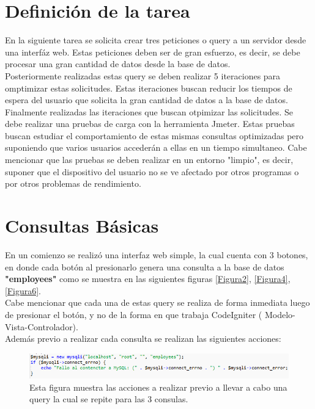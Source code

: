 \section{Definición de la tarea} \label{tarea}

En la siguiente tarea se solicita crear tres peticiones o query a un servidor desde una interfáz web. Estas peticiones deben ser de gran esfuerzo, es decir, se debe procesar una gran cantidad de datos desde la base de datos.\\

Posteriormente realizadas estas query se deben realizar 5 iteraciones para omptimizar estas solicitudes. Estas iteraciones buscan reducir los tiempos de espera del usuario que solicita la gran cantidad de datos a la base de datos.\\

Finalmente realizadas las iteraciones que buscan otpimizar las solicitudes. Se debe realizar una pruebas de carga con la herramienta Jmeter. Estas pruebas buscan estudiar el comportamiento de estas mismas consultas optimizadas pero suponiendo que varios usuarios accederán a ellas en un tiempo simultaneo. Cabe mencionar que las pruebas se deben realizar en un entorno "limpio", es decir, suponer que el dispositivo del usuario no se ve afectado por otros programas o por otros problemas de rendimiento. \\

\section{Consultas Básicas}

En un comienzo se realizó una interfaz web simple, la cual cuenta con 3 botones, en donde cada botón al presionarlo genera una consulta a la base de datos \textbf{"employees"} como se muestra en las siguientes figuras \ref{Figura2}, \ref{Figura4}, \ref{Figura6}. \\ 
Cabe mencionar que cada una de estas query se realiza de forma inmediata luego de presionar el botón, y no de la forma en que trabaja CodeIgniter ( Modelo-Vista-Controlador). \\
Además previo a realizar cada consulta se realizan las siguientes acciones: 

\begin{figure}[htb]
	\label{Figura0}
	\begin{center}
		\includegraphics[scale=0.5]{imagenes/acciones.png}
	\end{center}
	\caption{Esta figura muestra las acciones a realizar previo a llevar a cabo una query la cual se repite para las 3 consulas.}
\end{figure}


